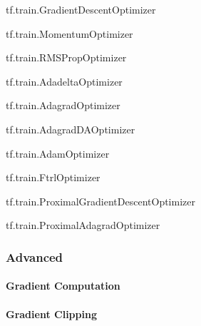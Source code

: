tf.train.GradientDescentOptimizer

tf.train.MomentumOptimizer

tf.train.RMSPropOptimizer

tf.train.AdadeltaOptimizer

tf.train.AdagradOptimizer

tf.train.AdagradDAOptimizer

tf.train.AdamOptimizer

tf.train.FtrlOptimizer

tf.train.ProximalGradientDescentOptimizer

tf.train.ProximalAdagradOptimizer

\subsubsection{Advanced}

\paragraph{Gradient Computation}

\paragraph{Gradient Clipping}